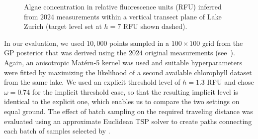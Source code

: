 %
\begin{figure}[tb]
  \centering
  \hspace{-0.7em}
  \caption{Algae concentration in relative fluorescence units (RFU)
           inferred from $2024$ measurements within a vertical transect plane
           of Lake Zurich (target level set at $h = 7$ RFU shown dashed).}
  \label{fig:limno_bgape}
\end{figure}

In our evaluation, we used $10,000$ points sampled in a $100 \times 100$ grid
from the GP posterior that was derived using the $2024$ original measurements
(see~).
Again, an anisotropic Mat\'{e}rn-5 kernel was used and suitable
hyperparameters were fitted by maximizing the
likelihood of a second available chlorophyll dataset from the same lake.
We used an explicit threshold level of $h = 1.3$ RFU and chose $\omega = 0.74$
for the implicit threshold case, so that the resulting implicit level is
identical to the explicit one, which enables us to compare the two settings on
equal ground.
The effect of batch sampling on the required traveling distance was evaluated
using an approximate Euclidean TSP solver to create paths connecting each
batch of samples selected by \bacl.

\setlength\figureheight{1.3in}\setlength\figurewidth{2.1in}
%
%

